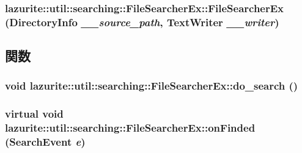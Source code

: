 \label{classlazurite_1_1util_1_1searching_1_1_file_searcher_ex_ae2756bb8d83eb1fe2cc1011b0f6fad6c}
\hypertarget{classlazurite_1_1util_1_1searching_1_1_file_searcher_ex_a773cd75d110af4bddfe77fe07b7f42bd}{
\subsubsection[{FileSearcherEx}]{\setlength{\rightskip}{0pt plus 5cm}lazurite::util::searching::FileSearcherEx::FileSearcherEx (DirectoryInfo {\em \_\-\_\-source\_\-path}, \/  TextWriter {\em \_\-\_\-writer})}}
\label{classlazurite_1_1util_1_1searching_1_1_file_searcher_ex_a773cd75d110af4bddfe77fe07b7f42bd}


\subsection{関数}
\hypertarget{classlazurite_1_1util_1_1searching_1_1_file_searcher_ex_a38a7385fccb13858ad0f3f6b5a03d6db}{
\subsubsection[{do\_\-search}]{\setlength{\rightskip}{0pt plus 5cm}void lazurite::util::searching::FileSearcherEx::do\_\-search ()}}
\label{classlazurite_1_1util_1_1searching_1_1_file_searcher_ex_a38a7385fccb13858ad0f3f6b5a03d6db}
\hypertarget{classlazurite_1_1util_1_1searching_1_1_file_searcher_ex_ab5fa27492288a1e1f772128c4a2af86c}{
\subsubsection[{onFinded}]{\setlength{\rightskip}{0pt plus 5cm}virtual void lazurite::util::searching::FileSearcherEx::onFinded ({\bf SearchEvent} {\em e})}}
\label{classlazurite_1_1util_1_1searching_1_1_file_searcher_ex_ab5fa27492288a1e1f772128c4a2af86c}

